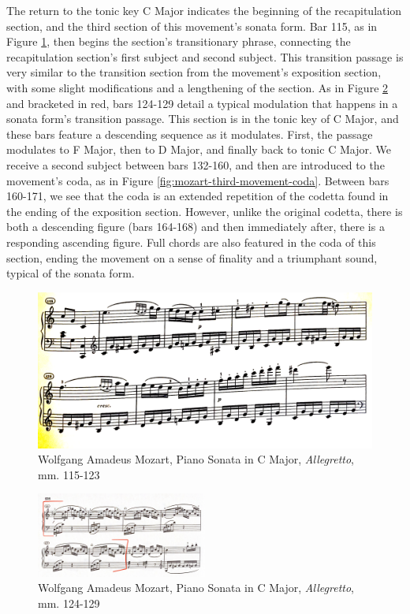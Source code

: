 The return to the tonic key C Major indicates the beginning of the recapitulation section, and the third section of this movement's sonata form. Bar 115, as in Figure \ref{fig:mozart-third-movement-bars-116-123}\autocite{Henle_1977}, then begins the section's transitionary phrase, connecting the recapitulation section's first subject and second subject. This transition passage is very similar to the transition section from the movement's exposition section, with some slight modifications and a lengthening of the section. As in Figure \ref{fig:mozart-third-movement-bars-124-129}\autocite{Henle_1977} and bracketed in red, bars 124-129 detail a typical modulation that happens in a sonata form's transition passage. This section is in the tonic key of C Major, and these bars feature a descending sequence as it modulates. First, the passage modulates to F Major, then to D Major, and finally back to tonic C Major. We receive a second subject between bars 132-160, and then are introduced to the movement's coda, as in Figure \ref{fig:mozart-third-movement-coda}\autocite{Henle_1977}. Between bars 160-171, we see that the coda is an extended repetition of the codetta found in the ending of the exposition section. However, unlike the original codetta, there is both a descending figure (bars 164-168) and then immediately after, there is a responding ascending figure. Full chords are also featured in the coda of this section, ending the movement on a sense of finality and a triumphant sound, typical of the sonata form.

\begin{figure}
	\centering
	\includegraphics[width=\textwidth]{figures/mozart-third-movement-bars-116-123.jpg}
	\caption{Wolfgang Amadeus Mozart, Piano Sonata in C Major, \textit{Allegretto}, mm. 115-123}
	\label{fig:mozart-third-movement-bars-116-123}
\end{figure}

\begin{figure}
	\centering
	\includegraphics[width=0.5\textwidth]{figures/mozart-third-movement-bars-124-129.jpg}
	\caption{Wolfgang Amadeus Mozart, Piano Sonata in C Major, \textit{Allegretto}, mm. 124-129}
	\label{fig:mozart-third-movement-bars-124-129}
\end{figure}

